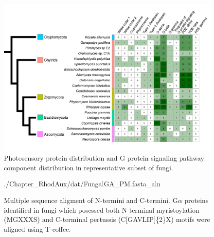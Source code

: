 
\begin{figure}[htbp]
  \includegraphics[]{./Chapter_RhodAux/img/photosenseHeatmap_modified.png}
  \caption[Photosensory survey]{Photosensory protein distribution and G protein signaling pathway component distribution in representative subset of fungi.}
  \label{fig:ChRhodA_photosenseSurvey}
\end{figure}

\begin{figure}[htbp]
  \begin{texshade}{./Chapter_RhodAux/dat/FungalGA_PM.fasta_aln}
    \hidenumbering
  \end{texshade}
  \caption[G$\alpha$ MSA]{Multiple sequence aligment of N-termini and C-termini. G$\alpha$ proteins identified in fungi which posessed both N-terminal myristoylation (MGXXXS) and C-terminal pertussis (C[GAVLIP]\{2\}X) motifs were aligned using T-coffee.}
  \label{fig:ChRhodA_gaMSA}
\end{figure}

